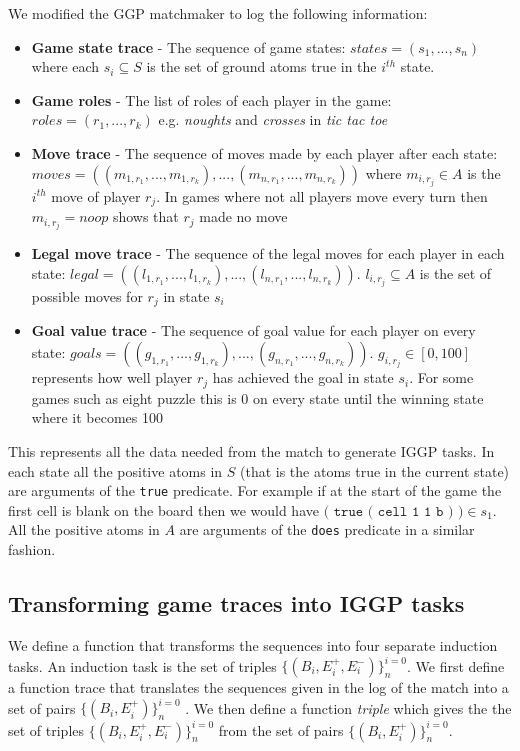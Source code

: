 We modified the GGP matchmaker to log the following information:
\begin{itemize}
	\item \textbf{Game state trace} - The sequence of game states: $states = (s_1,...,s_n)$ where each $s_i \subseteq S$ is the set of ground atoms true in the $i^{th}$ state.
	\item \textbf{Game roles} - The list of roles of each player in the game: $roles = (r_1,...,r_k)$ e.g. \textit{noughts} and \textit{crosses} in \textit{tic tac toe}
	\item \textbf{Move trace} - The sequence of moves made by each player after each state: $moves = ((m_{1,r_1},...,m_{1,r_k}),...,(m_{n,r_1},...,m_{n,r_k}))$ where $m_{i,r_j} \in A$ is the $i^{th}$ move of player $r_j$. In games where not all players move every turn then $m_{i,r_j}=noop$ shows that $r_j$ made no move
	\item \textbf{Legal move trace} - The sequence of the legal moves for each player in each state:  $legal = ((l_{1,r_1},...,l_{1,r_k}),...,(l_{n,r_1},...,l_{n,r_k}))$. $l_{i,r_j} \subseteq A$ is the set of possible moves for $r_j$ in state $s_i$
	\item \textbf{Goal value trace} - The sequence of goal value for each player on every state: $goals = ((g_{1,r_1},...,g_{1,r_k}),...,(g_{n,r_1},...,g_{n,r_k}))$. $g_{i,r_j} \in [0,100]$ represents how well player $r_j$ has achieved the goal in state $s_i$. For some games such as eight puzzle this is 0 on every state until the winning state where it becomes 100

\end{itemize}
This represents all the data needed from the match to generate IGGP tasks. In each state all the positive atoms in $S$ (that is the atoms true in the current state) are arguments of the \texttt{true} predicate. For example if at the start of the game the first cell is blank on the board then we would have $\texttt{( true ( cell 1 1 b ) )} \in s_1$. All the positive atoms in $A$ are arguments of the \texttt{does} predicate in a similar fashion. 

\subsection{Transforming game traces into IGGP tasks}

We define a function that transforms the sequences into four separate induction tasks. An induction task is the set of triples $\{(B_i,E_i^+,E_i^-)\}_n^{i=0}$. We first define a function trace that translates the sequences given in the log of the match into a set of pairs $\{(B_i,E_i^+)\}_n^{i=0}$ . We then define a function \textit{triple} which gives the the set of triples  $\{(B_i,E_i^+,E_i^-)\}_n^{i=0}$ from the set of pairs $\{(B_i,E_i^+)\}_n^{i=0}$.
\\

